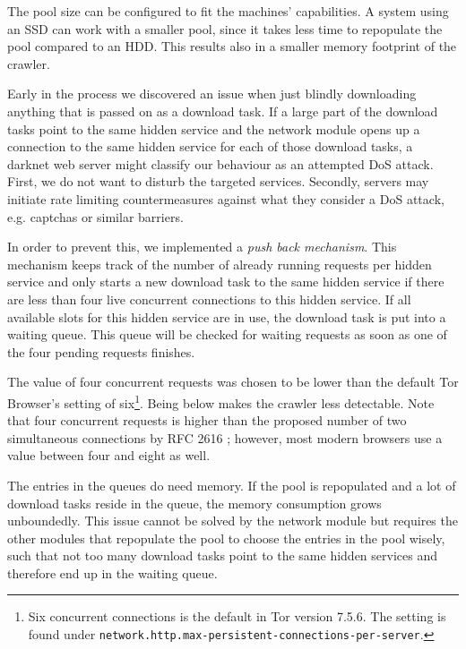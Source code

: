 The pool size can be configured to fit the machines' capabilities. A system using an SSD can work with a smaller pool, since it takes less time to repopulate the pool compared to an HDD. This results also in a smaller memory footprint of the crawler.

\label{sec:DoSLike}
Early in the process we discovered an issue when just blindly downloading anything that is passed on as a download task. If a large part of the download tasks point to the same hidden service and the network module opens up a connection to the same hidden service for each of those download tasks, a darknet web server might classify our behaviour as an attempted DoS attack. First, we do not want to disturb the targeted services. Secondly, servers may initiate rate limiting countermeasures against what they consider a DoS attack, e.g. captchas or similar barriers.

In order to prevent this, we implemented a \emph{push back mechanism}. This mechanism keeps track of the number of already running requests per hidden service and only starts a new download task to the same hidden service if there are less than four live concurrent connections to this hidden service. If all available slots for this hidden service are in use, the download task is put into a waiting queue. This queue will be checked for waiting requests as soon as one of the four pending requests finishes.

The value of four concurrent requests was chosen to be lower than the default Tor Browser's setting of six\footnote{Six concurrent connections is the default in Tor version 7.5.6. The setting is found under \texttt{network.http.max-persistent-connections-per-server}.}. Being below makes the crawler less detectable. Note that four concurrent requests is higher than the proposed number of two simultaneous connections by RFC 2616 \cite{Nielsen1999}; however, most modern browsers use a value between four and eight as well.

The entries in the queues do need memory. If the pool is repopulated and a lot of download tasks reside in the queue, the memory consumption grows unboundedly. This issue cannot be solved by the network module but requires the other modules that repopulate the pool to choose the entries in the pool wisely, such that not too many download tasks point to the same hidden services and therefore end up in the waiting queue.

